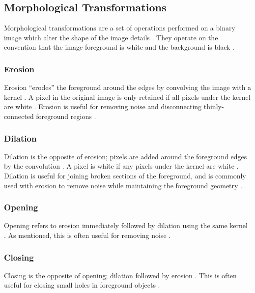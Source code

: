 \newpage
\subsection{Morphological Transformations}

Morphological transformations are a set of operations performed on a binary image which alter the shape of the image details \cite{opencv_mt}. They operate on the convention that the image foreground is white and the background is black \cite{opencv_mt}.

\subsubsection*{Erosion}

Erosion ``erodes'' the foreground around the edges by convolving the image with a kernel \cite{opencv_mt}. A pixel in the original image is only retained if all pixels under the kernel are white \cite{opencv_mt}. Erosion is useful for removing noise and disconnecting thinly-connected foreground regions \cite{opencv_mt}.

\subsubsection*{Dilation}

Dilation is the opposite of erosion; pixels are added around the foreground edges by the convolution \cite{opencv_mt}. A pixel is white if any pixels under the kernel are white \cite{opencv_mt}. Dilation is useful for joining broken sections of the foreground, and is commonly used with erosion to remove noise while maintaining the foreground geometry \cite{opencv_mt}.

\subsubsection*{Opening}

Opening refers to erosion immediately followed by dilation using the same kernel \cite{opencv_mt}. As mentioned, this is often useful for removing noise \cite{opencv_mt}.

\subsubsection*{Closing}

Closing is the opposite of opening; dilation followed by erosion \cite{opencv_mt}. This is often useful for closing small holes in foreground objects \cite{opencv_mt}.

